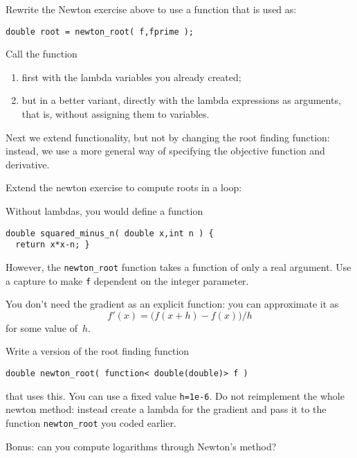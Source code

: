 \begin{exercise}
  \label{ex:newton-function-ptr}
  Rewrite the Newton exercise above to use a function
  that is used as:
\begin{lstlisting}
double root = newton_root( f,fprime );
\end{lstlisting}
Call the function
\begin{enumerate}
  \item first with the lambda variables you already created; 
  \item but in a better variant, 
    directly with the lambda expressions as arguments,
    that is,  without assigning them to variables.
\end{enumerate}
\end{exercise}

Next we extend functionality, but not by changing the root finding function:
instead, we use a more general way of specifying the objective function
and derivative.

\begin{exercise}
  \label{ex:newton-capture-root}
  Extend the newton exercise to compute roots in a loop:

  Without lambdas, you would define a function
\begin{lstlisting}
double squared_minus_n( double x,int n ) {
  return x*x-n; }
\end{lstlisting}
However, the \lstinline{newton_root} function takes a function of only
a real argument.
Use a capture to make \lstinline{f} dependent on the integer parameter.
\end{exercise}

\begin{exercise}
  \label{ex:newton-capture-diff}
  You don't need the gradient as an explicit function:
  you can approximate it as
  \[ f'(x) = \bigl( f(x+h)-f(x) \bigr) /h \]
  for some value of~$h$.

  Write a version of the root finding function
\begin{lstlisting}
double newton_root( function< double(double)> f ) 
\end{lstlisting}
that uses this. You can use a fixed value \lstinline+h=1e-6+.
Do not reimplement the whole newton method:
instead create a lambda for the gradient and pass it to the
function \lstinline+newton_root+ you coded earlier.
\end{exercise}

\begin{exercise}
  Bonus: can you compute logarithms through Newton's method?
\end{exercise}

